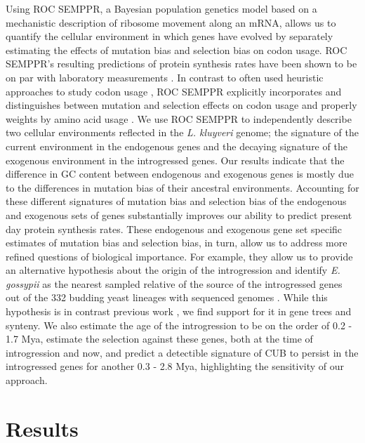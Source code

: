 \documentclass{bmcart}
\newcommand{\kluyveri}{\textit{L. kluyveri}\xspace}
\newcommand{\gossypii}{\textit{E. gossypii}\xspace}
\newcommand{\ROC}{ROC SEMPPR\xspace}
\newcommand{\GC}{GC content\xspace}
\begin{document}
Using \ROC, a Bayesian population genetics model based on a mechanistic description of ribosome movement along an mRNA, allows us to quantify the cellular environment in which genes have evolved by separately estimating the effects of mutation bias and selection bias on codon usage.
\ROC's resulting predictions of protein synthesis rates have been shown to be on par with laboratory measurements \citep{ShahAndGilchrist2011, gilchrist2015}.
In contrast to often used heuristic approaches to study codon usage \citep{sharp1987, Wright1990, dosreis2004}, \ROC explicitly incorporates and distinguishes between mutation and selection effects on codon usage and properly weights by amino acid usage \citep{cope2018}.
We use \ROC to independently describe two cellular environments reflected in the \kluyveri genome; the signature of the current environment in the endogenous genes and the decaying signature of the exogenous environment in the introgressed genes.
Our results indicate that the difference in \GC between endogenous and exogenous genes is mostly due to the differences in mutation bias of their ancestral environments.
Accounting for these different signatures of mutation bias and selection bias of the endogenous and exogenous sets of genes substantially improves our ability to predict present day protein synthesis rates.
These endogenous and exogenous gene set specific estimates of mutation bias and selection bias, in turn, allow us to address more refined questions of biological importance.
For example, they allow us to provide an alternative hypothesis about the origin of the introgression and identify \gossypii as the nearest sampled relative of the source of the introgressed genes out of the 332 budding yeast lineages with sequenced genomes \citep{shen2018}.
While this hypothesis is in contrast previous work \citep{payen2009, friedrich2015, vakirlis2016, brion2017}, we find support for it in gene trees and synteny.
We also estimate the age of the introgression to be on the order of 0.2 - 1.7 Mya, estimate the selection against these genes, both at the time of introgression and now, and predict a detectible signature of CUB to persist in the introgressed genes for another 0.3 - 2.8 Mya, highlighting the sensitivity of our approach.

\section*{Results}
\end{document}
